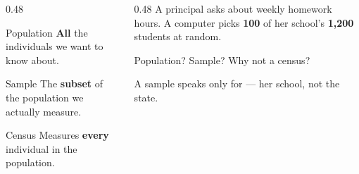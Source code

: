 \documentclass[aspectratio=169, 11pt]{beamer}
\begin{document}
\begin{frame}[t, plain]
  \vspace{2pt}
  \begin{columns}[t]
    \begin{column}{0.48\textwidth}
      \begin{block}{Population}
        \textbf{All} the individuals we want to know about.
      \end{block}
      \vspace{3pt}
      \begin{block}{Sample}
        The \textbf{subset} of the population we actually measure.
      \end{block}
      \vspace{3pt}
      \begin{block}{Census}
        Measures \textbf{every} individual in the population.
      \end{block}
    \end{column}
    \begin{column}{0.48\textwidth}
      A principal asks about weekly homework hours. A computer picks \textbf{100} of her
      school's \textbf{1{,}200} students at random.
      \vspace{8pt}

      Population? Sample? Why not a census?
      \vspace{8pt}

      A sample speaks only for  --- her school, not the
      state.
    \end{column}
  \end{columns}
\end{frame}
\end{document}

